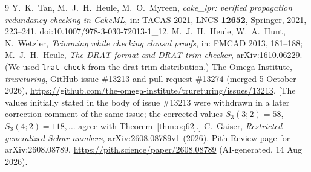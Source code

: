 \documentclass[11pt]{amsart}
\theoremstyle{definition}
\begin{document}
\begin{thebibliography}{9}
 Y.~K.~Tan, M.~J.~H.~Heule, M.~O.~Myreen, \emph{cake\_lpr: verified propagation redundancy checking in CakeML}, in: TACAS 2021, LNCS \textbf{12652}, Springer, 2021, 223--241. doi:10.1007/978-3-030-72013-1\_12.
 M.~J.~H.~Heule, W.~A.~Hunt, N.~Wetzler, \emph{Trimming while checking clausal proofs}, in: FMCAD 2013, 181--188; M.~J.~H.~Heule, \emph{The DRAT format and DRAT-trim checker}, arXiv:1610.06229. (We used \texttt{lrat-check} from the drat-trim distribution.)
 The Omega Institute, \emph{trureturing}, GitHub issue \#13213 and pull request \#13274 (merged 5 October 2026), \url{https://github.com/the-omega-institute/trureturing/issues/13213}. [The values initially stated in the body of issue \#13213 were withdrawn in a later correction comment of the same issue; the corrected values $S_3(3;2)=58$, $S_3(4;2)=118,\dots$ agree with Theorem~\ref{thm:oq62}.]
 C.~Gaiser, \emph{Restricted generalized Schur numbers}, arXiv:2608.08789v1 (2026).
 Pith Review page for arXiv:2608.08789, \url{https://pith.science/paper/2608.08789} (AI-generated, 14 Aug 2026).
\end{thebibliography}
\end{document}
